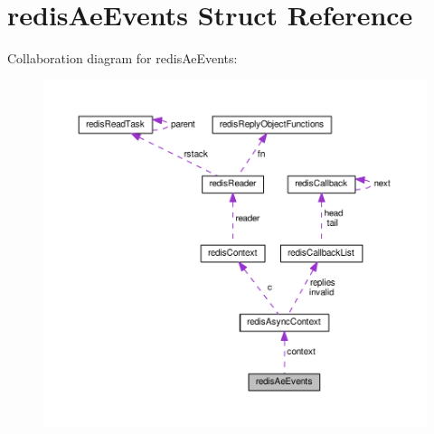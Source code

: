 \hypertarget{structredis_ae_events}{\section{redis\+Ae\+Events Struct Reference}
\label{structredis_ae_events}
}


Collaboration diagram for redis\+Ae\+Events\+:\nopagebreak
\begin{figure}[H]
\begin{center}
\leavevmode
\includegraphics[width=350pt]{structredis_ae_events__coll__graph}
\end{center}
\end{figure}
